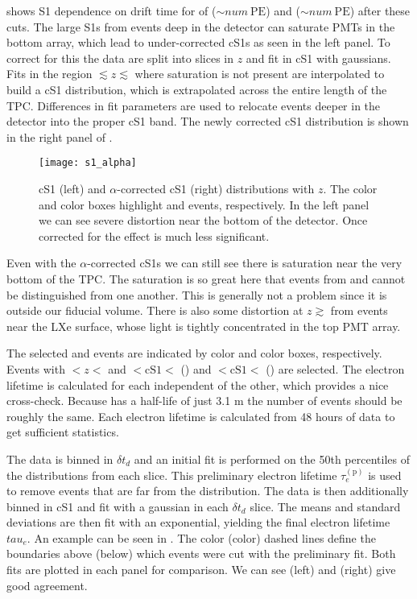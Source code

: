  shows S1 dependence on drift time for \alphadecays of 
(${\sim} num\ \mathrm{PE}$) and  (${\sim} num\ \mathrm{PE}$) after these cuts.  The large
S1s from events deep in the detector can saturate PMTs in the bottom array, which lead to under-corrected cS1s as seen in the left
panel.  To correct for this the data are split into slices in $z$ and fit in cS1 with gaussians.  Fits in the region
$\lesssim z \lesssim$ where saturation is not present are interpolated to build a cS1 distribution, which is extrapolated across the
entire length of
the TPC.  Differences in fit parameters are used to relocate events deeper in the detector into the proper cS1 band.  The newly corrected
cS1 distribution is shown in the right panel of .

\begin{figure}
\centering
\texttt{[image: s1\_alpha]}
\caption{cS1 (left) and $\alpha$-corrected cS1 (right) distributions with $z$.  The color and color boxes highlight  and
 events, respectively.  In the left panel we can see severe distortion near the bottom of the detector.  Once corrected for
the effect is much less significant.}
\label{fig:electron_lifetimes_measurement_alphas_s1}
\end{figure}

Even with the $\alpha$-corrected cS1s we can still see there is saturation near the very bottom of the TPC.  The saturation is so great
here that events from  and  cannot be distinguished from one another.  This is generally not a problem since it
is outside our fiducial volume.  There is also some distortion at $z \gtrsim$ from events
near the LXe surface, whose light is tightly concentrated in the top PMT array.

The selected  and  events are indicated by color and color boxes, respectively.  Events with $< z < $ and
$< \mathrm{cS1} < $ () and $< \mathrm{cS1} <$ () are selected.  The electron lifetime is calculated for each
independent of the other, which provides a nice cross-check.  Because  has a half-life of just 3.1 m the number of events
should be roughly the same.  Each electron lifetime is calculated from 48 hours of data to get sufficient statistics.

The data is binned in $\delta t_d$ and an initial fit is performed on the 50th percentiles of the \stwob distributions from each
slice.  This preliminary electron lifetime $\tau_e^{(\mathrm{p})}$ is used to remove events that are far from the distribution.  The data
is then additionally binned in cS1 and fit with a gaussian in each $\delta t_d$ slice.  The means and standard deviations are then fit
with an exponential, yielding the final electron lifetime $tau_e$.  An example can be seen in
.  The color (color) dashed lines define the boundaries above (below) which
events were cut with the preliminary fit.  Both fits are plotted in each panel for comparison.  We can see  (left) and
 (right) give good agreement.

